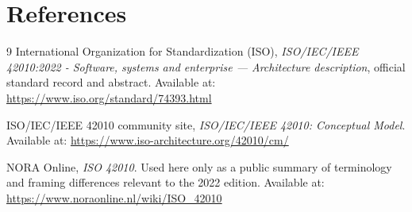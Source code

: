 \documentclass[11pt]{article}
\begin{document}
\section*{References}
\begin{thebibliography}{9}
International Organization for Standardization (ISO), \emph{ISO/IEC/IEEE 42010:2022 - Software, systems and enterprise --- Architecture description}, official standard record and abstract. Available at: \url{https://www.iso.org/standard/74393.html}

ISO/IEC/IEEE 42010 community site, \emph{ISO/IEC/IEEE 42010: Conceptual Model}. Available at: \url{https://www.iso-architecture.org/42010/cm/}

NORA Online, \emph{ISO 42010}. Used here only as a public summary of terminology and framing differences relevant to the 2022 edition. Available at: \url{https://www.noraonline.nl/wiki/ISO_42010}
\end{thebibliography}
\end{document}
